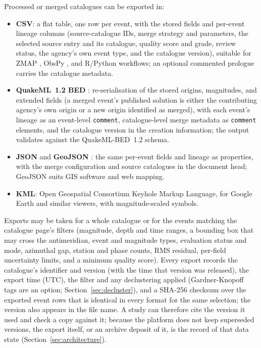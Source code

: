 \documentclass[12pt]{article}
\begin{document}
Processed or merged catalogues can be exported in:
\begin{itemize}[leftmargin=*]
  \item \textbf{CSV}: a flat table, one row per event, with the stored fields
    and per-event lineage columns (source-catalogue IDs, merge strategy and
    parameters, the selected source entry and its catalogue, quality score and
    grade, review status, the agency's own event type, and the catalogue
    version), suitable for
    ZMAP \citep{wiemer2001}, ObsPy \citep{obspy2010}, and R/Python workflows;
    an optional commented prologue carries the catalogue metadata.
  \item \textbf{QuakeML~1.2 BED} \citep{schorlemmer2011}: re-serialisation
    of the stored origins, magnitudes, and extended fields (a merged event's
    published solution is either the contributing agency's own origin or a new
    origin identified as merged), with each event's lineage as an event-level
    \texttt{comment}, catalogue-level merge metadata as \texttt{comment}
    elements, and the catalogue version in the creation information; the output
    validates against the QuakeML-BED~1.2 schema.
  \item \textbf{JSON} and \textbf{GeoJSON} \citep{geojson2016}: the same
    per-event fields and lineage as properties, with the merge configuration and
    source catalogues in the document head; GeoJSON suits GIS software and web
    mapping.
  \item \textbf{KML}: Open Geospatial Consortium Keyhole Markup Language,
    for Google Earth and similar viewers, with magnitude-scaled symbols.
\end{itemize}
Exports may be taken for a whole catalogue or for the events matching the
catalogue page's filters (magnitude, depth and time ranges, a bounding box that
may cross the antimeridian, event and magnitude types, evaluation status and
mode, azimuthal gap, station and phase counts, RMS residual, per-field
uncertainty limits, and a minimum quality score).  Every export records the
catalogue's identifier and version (with the time that version was released),
the export time (UTC), the filter and any declustering applied (Gardner-Knopoff
tags are an option; Section~\ref{sec:decluster}), and a SHA-256 checksum over the
exported event rows that is identical in every format for the same selection;
the version also appears in the file name.  A study can therefore cite the
version it used and check a copy against it; because the platform does not keep
superseded versions, the export itself, or an archive deposit of it, is the record
of that data state (Section~\ref{sec:architecture}).
\end{document}
